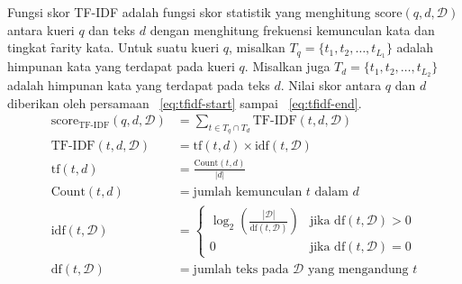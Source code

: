     Fungsi skor TF-IDF adalah fungsi skor statistik yang menghitung $\text{score}(q,d,\mathcal{D})$ antara kueri $q$ dan teks $d$ dengan menghitung frekuensi kemunculan kata dan tingkat \f{rarity} kata. Untuk suatu kueri $q$, misalkan $T_q= \{t_1, t_2, \dots, t_{L_1}\}$ adalah himpunan kata yang terdapat pada kueri $q$. Misalkan juga $T_d = \{t_1, t_2, \dots, t_{L_2}\}$ adalah himpunan kata yang terdapat pada teks $d$. Nilai skor antara $q$ dan $d$ diberikan oleh persamaan \equ~\ref{eq:tfidf-start} sampai \equ~\ref{eq:tfidf-end}.
    \begin{align}
        \label{eq:tfidf-start}
        \text{score}_{\text{TF-IDF}}(q,d,\mathcal{D}) &= \sum_{t \in T_q \cap T_d} \text{TF-IDF}(t, d, \mathcal{D}) \\
        \label{eq:tf-idf-weight}
        \text{TF-IDF}(t, d, \mathcal{D}) &= \text{tf}(t, d) \times \text{idf}(t, \mathcal{D}) \\
        \text{tf}(t, d) &= \frac{\text{Count}(t, d)}{|d|} \\
        \text{Count}(t, d) &= \text{jumlah kemunculan } t \text{ dalam } d \\
        \text{idf}(t, \mathcal{D}) &= \begin{cases}
            \log_2\left(\frac{|\mathcal{D}|}{\text{df}(t, \mathcal{D})}\right) & \text{jika } \text{df}(t, \mathcal{D}) > 0 \\
            0 & \text{jika } \text{df}(t, \mathcal{D}) = 0
        \end{cases} \\
        \text{df}(t, \mathcal{D}) &= \text{jumlah teks pada } \mathcal{D} \text{ yang mengandung } t
        \label{eq:tfidf-end}
    \end{align}

